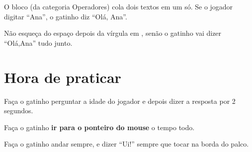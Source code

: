 O bloco  (da categoria Operadores) cola dois textos em um só. Se o jogador digitar ``Ana'', o gatinho diz ``Olá, Ana''.

\begin{cuidado}
Não esqueça do espaço depois da vírgula em , senão o gatinho vai dizer ``Olá,Ana'' tudo junto.
\end{cuidado}

\section{Hora de praticar}

\begin{exercicio}
Faça o gatinho perguntar a idade do jogador e depois dizer a resposta por 2 segundos.
\end{exercicio}

\begin{solucao}
\begin{pilha}
\end{pilha}
\end{solucao}

\begin{exercicio}
Faça o gatinho \textbf{ir para o ponteiro do mouse} o tempo todo.
\end{exercicio}

\begin{solucao}
\begin{pilha}
\sbcend
\end{pilha}
\end{solucao}

\begin{exercicio}
Faça o gatinho andar sempre, e dizer ``Ui!'' sempre que tocar na borda do palco.
\end{exercicio}

\begin{solucao}
\begin{pilha}
\sbcend
\sbcend
\end{pilha}
\end{solucao}


